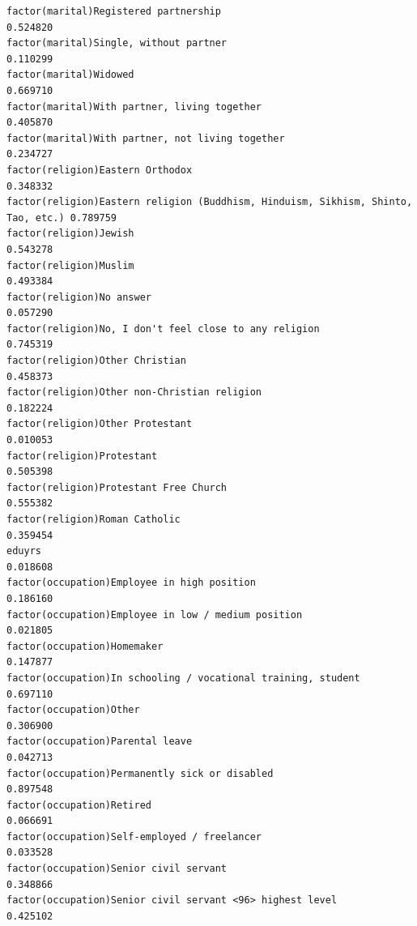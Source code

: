 \documentclass[
]{article}
\begin{document}
\begin{table}
\begin{minipage}[t]{\linewidth}
{\begin{verbatim}
factor(marital)Registered partnership                                             0.524820
factor(marital)Single, without partner                                            0.110299
factor(marital)Widowed                                                            0.669710
factor(marital)With partner, living together                                      0.405870
factor(marital)With partner, not living together                                  0.234727
factor(religion)Eastern Orthodox                                                  0.348332
factor(religion)Eastern religion (Buddhism, Hinduism, Sikhism, Shinto, Tao, etc.) 0.789759
factor(religion)Jewish                                                            0.543278
factor(religion)Muslim                                                            0.493384
factor(religion)No answer                                                         0.057290
factor(religion)No, I don't feel close to any religion                            0.745319
factor(religion)Other Christian                                                   0.458373
factor(religion)Other non-Christian religion                                      0.182224
factor(religion)Other Protestant                                                  0.010053
factor(religion)Protestant                                                        0.505398
factor(religion)Protestant Free Church                                            0.555382
factor(religion)Roman Catholic                                                    0.359454
eduyrs                                                                            0.018608
factor(occupation)Employee in high position                                       0.186160
factor(occupation)Employee in low / medium position                               0.021805
factor(occupation)Homemaker                                                       0.147877
factor(occupation)In schooling / vocational training, student                     0.697110
factor(occupation)Other                                                           0.306900
factor(occupation)Parental leave                                                  0.042713
factor(occupation)Permanently sick or disabled                                    0.897548
factor(occupation)Retired                                                         0.066691
factor(occupation)Self-employed / freelancer                                      0.033528
factor(occupation)Senior civil servant                                            0.348866
factor(occupation)Senior civil servant <96> highest level                         0.425102

\end{verbatim}}
\end{minipage}
\end{table}
\end{document}

